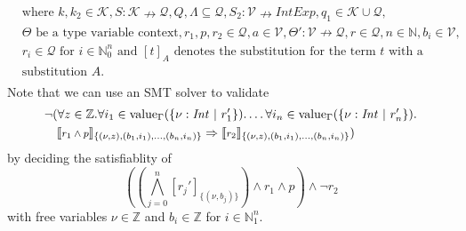 \documentclass[]{scrbook}
\newcommand{\semantic}[1]{\llbracket \text{\footnotesize\texttt{#1}} \rrbracket}
\theoremstyle{definition}
\theoremstyle{definition}
\theoremstyle{definition}
\theoremstyle{remark}
\begin{document}
\[\begin{aligned}
&\text{where } k,k_2\in\mathcal{K},S:\mathcal{K}\nrightarrow\mathcal{Q},Q,\Lambda\subseteq\mathcal{Q},S_2:\mathcal{V}\nrightarrow\mathit{IntExp},q_1\in\mathcal{K}\cup\mathcal{Q},\\
&\Theta\text{ be a type variable context},r_1,p,r_2\in\mathcal{Q}, a\in\mathcal{V},\Theta':\mathcal{V}\nrightarrow\mathcal{Q},r\in\mathcal{Q},n\in\mathbb{N}, b_i\in\mathcal{V},\\
&r_i\in\mathcal{Q}\text{ for } i\in\mathbb{N}_0^n \text{ and } [t]_A \text{ denotes the substitution for the term } t \text{ with a}\\
&\text{substitution } A.\\
\end{aligned}
\] Note that we can use an SMT solver to validate \[
\begin{aligned}
&\neg (\forall z \in \mathbb{Z}.\forall i_1\in\text{value}_\Gamma(\{\nu:\mathit{Int}\ |\ r_1'\}).\dots \forall i_n\in\text{value}_\Gamma(\{\nu:\mathit{Int}\ |\ r_n'\}).\\
&\quad\semantic{$r_1\land p$}_{\{(\nu,z),(b_1,i_1),\dots,(b_n,i_n)\}}\Rightarrow \semantic{$r_2$}_{\{(\nu,z),(b_1,i_1),\dots,(b_n,i_n)\}})\\
\end{aligned}
\] by deciding the satisfiablity of
\[((\bigwedge_{j=0}^n [r_j']_{\{(\nu,b_j)\}})\land r_1\land p)\land \neg r_2\]
with free variables \(\nu\in\mathbb{Z}\) and \(b_i\in\mathbb{Z}\) for
\(i\in\mathbb{N}_1^n\).
\end{document}
